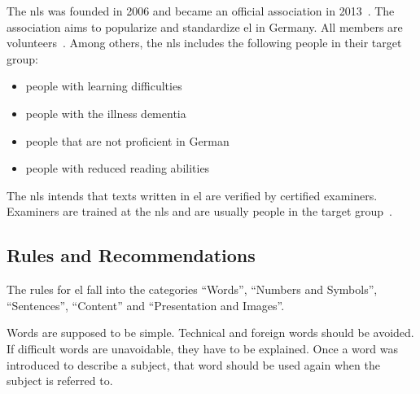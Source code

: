 The \gls{nls} was founded in 2006 and became an official association in 2013~\autocite{netzwerkHistory}.
The association aims to popularize and standardize \gls{el} in Germany.
All members are volunteers~\autocite{netzwerkGoals}.
Among others, the \gls{nls} includes the following people in their target group:
\begin{itemize}[noitemsep]
    \item people with learning difficulties
    \item people with the illness dementia
    \item people that are not proficient in German
    \item people with reduced reading abilities
\end{itemize}
The \gls{nls} intends that texts written in \gls{el} are verified by certified examiners.
Examiners are trained at the \gls{nls} and are usually people in the target group~\autocite{netzwerkPruef}.

\subsection{Rules and Recommendations}\label{subsec:el-rules}
The rules for \gls{el} fall into the categories \enquote{Words}, \enquote{Numbers and Symbols}, \enquote{Sentences}, \enquote{Content} and \enquote{Presentation and Images}.

Words are supposed to be simple.
Technical and foreign words should be avoided.
If difficult words are unavoidable, they have to be explained.
Once a word was introduced to describe a subject, that word should be used again when the subject is referred to.

